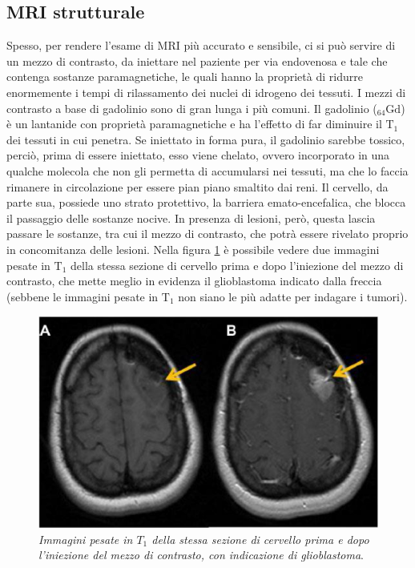 \documentclass{report}
\newcommand{\figref}[1]{figura \ref{#1}}
\numberwithin{equation}{section}
\numberwithin{figure}{section}
\begin{document}
\subsection{MRI strutturale}
Spesso, per rendere l'esame di MRI più accurato e sensibile, ci si può servire di un mezzo di contrasto, da iniettare nel paziente per via endovenosa e tale che contenga sostanze paramagnetiche, le quali hanno la proprietà di ridurre enormemente i tempi di rilassamento dei nuclei di idrogeno dei tessuti. I mezzi di contrasto a base di gadolinio sono di gran lunga i più comuni. Il gadolinio ($\mathrm{_{64}Gd}$) è un lantanide con proprietà paramagnetiche e ha l'effetto di far diminuire il $\mathrm{T_1}$ dei tessuti in cui penetra. Se iniettato in forma pura, il gadolinio sarebbe tossico, perciò, prima di essere iniettato, esso viene chelato, ovvero incorporato in una qualche molecola che non gli permetta di accumularsi nei tessuti, ma che lo faccia rimanere in circolazione per essere pian piano smaltito dai reni. Il cervello, da parte sua, possiede uno strato protettivo, la barriera emato-encefalica, che blocca il passaggio delle sostanze nocive. In presenza di lesioni, però, questa lascia passare le sostanze, tra cui il mezzo di contrasto, che potrà essere rivelato proprio in concomitanza delle lesioni. Nella \figref{fig:glio2} è possibile vedere due immagini pesate in $\mathrm{T_1}$ della stessa sezione di cervello prima e dopo l'iniezione del mezzo di contrasto, che mette meglio in evidenza il glioblastoma indicato dalla freccia (sebbene le immagini pesate in $\mathrm{T_1}$ non siano le più adatte per indagare i tumori).

\begin{figure}[H]
\centering
\includegraphics[scale=0.73]{immagini/glio2.png}
\caption{\label{fig:glio2} \textit{Immagini pesate in $T_1$ della stessa sezione di cervello prima e dopo l'iniezione del mezzo di contrasto, con indicazione di glioblastoma}.}
\end{figure}
\end{document}

